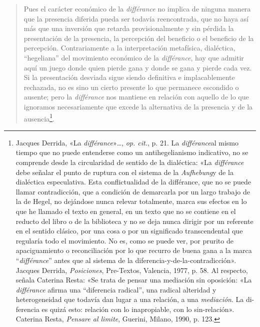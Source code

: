 \begin{quote}
Pues el carácter económico de la \emph{différance} no implica de ninguna manera que la presencia diferida pueda ser todavía reencontrada, que no haya así más que una inversión que retarda provisionalmente y sin pérdida la presentación de la presencia, la percepción del beneficio o el beneficio de la percepción. Contrariamente a la interpretación metafísica, dialéctica, ``hegeliana'' del movimiento económico de la \emph{différance}, hay que admitir aquí un juego donde quien pierde gana y donde se gana y pierde cada vez. Si la presentación desviada sigue siendo definitiva e implacablemente rechazada, no es sino un cierto presente lo que permanece escondido o ausente; pero la \emph{différance} nos mantiene en relación con aquello de lo que ignoramos necesariamente que excede la alternativa de la presencia y de la ausencia\footnote{Jacques Derrida, «La \emph{différance}»\ldots, \emph{op. cit.}, p. 21. La \emph{différance}al mismo tiempo que no puede entenderse como un antihegelianismo indicativo, no se comprende desde la circularidad de sentido de la dialéctica: «La \emph{différance} debe señalar el punto de ruptura con el sistema de la \emph{Aufhebung}y de la dialéctica especulativa. Esta conflictualidad de la différance, que no se puede llamar contradicción, que a condición de demarcarla por un largo trabajo de la de Hegel, no dejándose nunca relevar totalmente, marca sus efectos en lo que he llamado el texto en general, en un texto que no se contiene en el reducto del libro o de la biblioteca y no se deja nunca dirigir por un referente en el sentido clásico, por una cosa o por un significado transcendental que regularía todo el movimiento. No es, como se puede ver, por prurito de apaciguamiento o reconciliación por lo que recurro de buena gana a la marca ``\emph{différance}'' antes que al sistema de la diferencia-y-de-la-contradicción». Jacques Derrida, \emph{Posiciones}, Pre-Textos, Valencia, 1977, p. 58. Al respecto, señala Caterina Resta: «Se trata de pensar una mediación sin oposición: «La \emph{différance} afirma una ``diferencia radical'', una radical alteridad y heterogeneidad que todavía dan lugar a una relación, a una \emph{mediación}. La di-ferencia es quizá esto: relación con lo inapropiable, con lo sin-relación». Caterina Resta, \emph{Pensare al limite}, Guerini, Milano, 1990, p. 123.}.
\end{quote}

